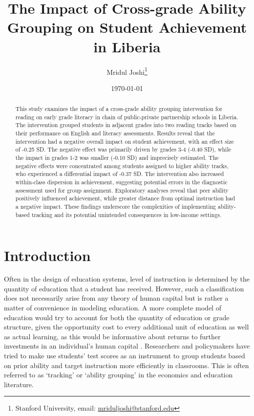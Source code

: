 \documentclass[12pt]{article}
\title{The Impact of Cross-grade Ability Grouping on Student Achievement in Liberia}
\begin{document}
\begin{titlepage}
\author{Mridul Joshi\footnote{Stanford University, email: \protect\href{mailto:mriduljoshi@stanford.edu}{mriduljoshi@stanford.edu}}}

\date{ \today \\}
\maketitle

\begin{abstract}\noindent
This study examines the impact of a cross-grade ability grouping intervention for reading on early grade literacy in chain of public-private partnership schools in Liberia. The intervention grouped students in adjacent grades into two reading tracks based on their performance on English and literacy assessments. Results reveal that the intervention had a negative overall impact on student achievement, with an effect size of -0.25 SD. The negative effect was primarily driven by grades 3-4 (-0.40 SD), while the impact in grades 1-2 was smaller (-0.10 SD) and imprecisely estimated. The negative effects were concentrated among students assigned to higher ability tracks, who experienced a differential impact of -0.37 SD. The intervention also increased within-class dispersion in achievement, suggesting potential errors in the diagnostic assessment used for group assignment. Exploratory analyses reveal that peer ability positively influenced achievement, while greater distance from optimal instruction had a negative impact. These findings underscore the complexities of implementing ability-based tracking and its potential unintended consequences in low-income settings.

\end{abstract}
\setcounter{page}{0}
\thispagestyle{empty}
\end{titlepage}
\doublespacing

\section{Introduction}
Often in the design of education systems, level of instruction is determined by the quantity of education that a student has received. However, such a classification does not necessarily arise from any theory of human capital but is rather a matter of convenience in modeling education. A more complete model of education would try to account for both the quantity of education or grade structure, given the opportunity cost to every additional unit of education as well as actual learning, as this would be informative about returns to further investments in an individual's human capital  \citep{becker2009human}. Researchers and policymakers have tried to make use students' test scores as an instrument to group students based on prior ability and target instruction more efficiently in classrooms. This is often referred to as `tracking' or `ability grouping' in the economics and education literature. 
\end{document}
